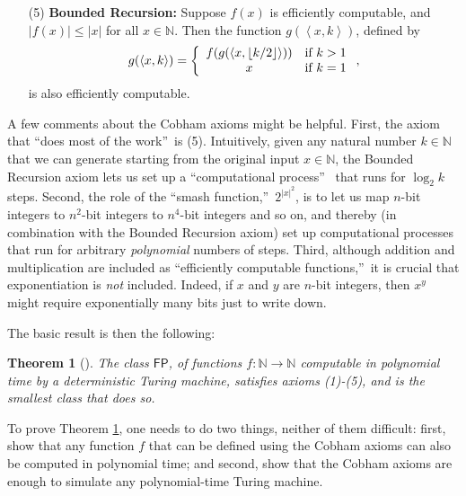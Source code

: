 \documentclass[12pt,onecolumn]{article}%
\newtheorem{theorem}{Theorem}
\begin{document}
\begin{enumerate}
\item[(5)] \textbf{Bounded Recursion:} Suppose $f(x)  $ is
efficiently computable, and $\left\vert f(x)  \right\vert
\leq\left\vert x\right\vert $ for all $x\in\mathbb{N}$. Then the function
$g(  \left\langle x,k\right\rangle )  $, defined by%
\[
g(  \left\langle x,k\right\rangle )  =\left\{
\begin{array}
[c]{cc}%
f(  g(  \left\langle x,\left\lfloor k/2\right\rfloor \right\rangle
)  )  & \text{if }k>1\\
x & \text{if }k=1
\end{array}
\right.  ,
\]
is also efficiently computable.
\end{enumerate}

A few comments about the Cobham axioms might be helpful. First, the axiom
that \textquotedblleft does most of the work\textquotedblright\  is (5).
 Intuitively, given any natural number $k\in\mathbb{N}$ that we can generate
starting from the original input $x\in\mathbb{N}$, the Bounded Recursion axiom
lets us set up a \textquotedblleft computational process\textquotedblright\ %
 that runs for $\log_{2}k$ steps. Second, the role of the
\textquotedblleft smash function,\textquotedblright\  $2^{\left\vert
x\right\vert ^{2}}$, is to let us map $n$-bit integers to $n^{2}$-bit integers
to $n^{4}$-bit integers and so on, and thereby (in combination with the
Bounded Recursion axiom) set up computational processes that run for arbitrary
\textit{polynomial} numbers of steps. Third, although addition and
multiplication are included as \textquotedblleft efficiently computable
functions,\textquotedblright\  it is crucial that exponentiation is
\textit{not} included. Indeed, if $x$ and $y$ are $n$-bit integers, then
$x^{y}$ might require exponentially many bits just to write down.

The basic result is then the following:

\begin{theorem}
[\cite{cobham,rose}]\label{cobhamthm}The class $\mathsf{FP}$, of functions
$f:\mathbb{N}\rightarrow\mathbb{N}$ computable in polynomial time by a
deterministic Turing machine, satisfies axioms (1)-(5), and is the smallest
class that does so.
\end{theorem}

To prove Theorem \ref{cobhamthm}, one needs to do two things, neither of them
difficult: first, show that any function $f$ that can be defined using the
Cobham axioms can also be computed in polynomial time; and second, show that
the Cobham axioms are enough to simulate any polynomial-time Turing machine.
\end{document}
